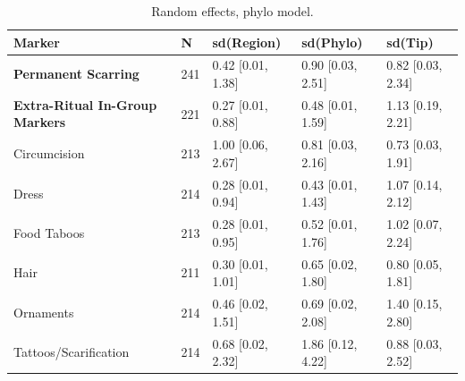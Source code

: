 \begin{table}[!ht]
\centering
\small
\caption{Random effects, phylo model.}
\label{tab:int_random_effects_phylo}
\begin{tabular}{lllll}
\toprule
Marker & N & sd(Region) & sd(Phylo) & sd(Tip) \\
\midrule
\textbf{Permanent Scarring} & 241 & 0.42 [0.01, 1.38] & 0.90 [0.03, 2.51] & 0.82 [0.03, 2.34] \\
\textbf{Extra-Ritual In-Group Markers} & 221 & 0.27 [0.01, 0.88] & 0.48 [0.01, 1.59] & 1.13 [0.19, 2.21] \\
\midrule
Circumcision & 213 & 1.00 [0.06, 2.67] & 0.81 [0.03, 2.16] & 0.73 [0.03, 1.91] \\
Dress & 214 & 0.28 [0.01, 0.94] & 0.43 [0.01, 1.43] & 1.07 [0.14, 2.12] \\
Food Taboos & 213 & 0.28 [0.01, 0.95] & 0.52 [0.01, 1.76] & 1.02 [0.07, 2.24] \\
Hair & 211 & 0.30 [0.01, 1.01] & 0.65 [0.02, 1.80] & 0.80 [0.05, 1.81] \\
Ornaments & 214 & 0.46 [0.02, 1.51] & 0.69 [0.02, 2.08] & 1.40 [0.15, 2.80] \\
Tattoos/Scarification & 214 & 0.68 [0.02, 2.32] & 1.86 [0.12, 4.22] & 0.88 [0.03, 2.52] \\
\bottomrule
\end{tabular}
\end{table}